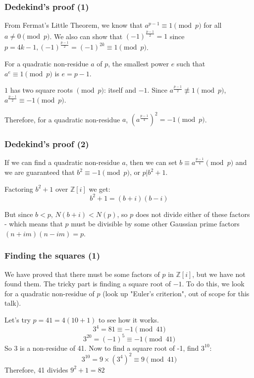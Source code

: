 \documentclass{beamer}
\begin{document}
\begin{frame}
	\frametitle{Dedekind's proof (1)}

	From Fermat's Little Theorem, we know that $a^{p-1} \equiv 1 \pmod{p}$ for all
	$a\neq 0 \pmod{p}$. We also can show that $(-1)^{\frac{p-1}{2}} = 1$ since 
	$p = 4k-1, (-1)^{\frac{p-1}{2}} = (-1)^{2k} \equiv 1 \pmod{p}$.

	For a quadratic non-residue $a$ of $p$, the smallest power $e$ such that $a^{e} \equiv 1 \pmod{p}$
	is $e = p-1$.

	$1$ has two square roots $\pmod{p}$: itself and $-1$. Since $a^{\frac{p-1}{2}} \not \equiv 1
	\pmod{p}$, $a^{\frac{p-1}{2}} \equiv -1 \pmod{p}$.

	Therefore, for a quadratic non-residue $a$, $(a^{\frac{p-1}{4}})^2 = -1 \pmod{p}$.

\end{frame}
\begin{frame}
	\frametitle{Dedekind's proof (2)}

	If we can find a quadratic non-residue $a$, then we can set $b \equiv a^{\frac{p-1}{4}} \pmod{p}$
	and we are guaranteed that $b^2 \equiv -1 \pmod{p}$, or $p | b^2+1$.

	Factoring $b^2+1$ over $\mathbb{Z}[i]$ we get:
	\[b^2 + 1 = (b+i)(b-i) \]
	
	But since $b<p$, $N(b+i)<N(p)$, so $p$ does not divide either of these factors - which means
	that $p$ must be divisible by some other Gaussian prime factors $(n+im)(n-im) = p$.
\end{frame}

\begin{frame}
	\frametitle{Finding the squares (1)}

	We have proved that there must be some factors of $p$ in $\mathbb{Z}[i]$, but we
	have not found them. The tricky part is finding a square root of $-1$. To do this,
	we look for a quadratic non-residue of $p$ (look up "Euler's criterion", out of
	scope for this talk).

	Let's try $p=41 = 4(10+1)$ to see how it works.
	\[ 3^4 = 81 \equiv -1 \pmod{41} \]
	\[ 3^{20} = (-1)^5 \equiv -1 \pmod{41} \]
	So 3 is a non-residue of 41. Now to find a square root of -1, find $3^{10}$:
	\[ 3^{10} = 9\times(3^4)^2 \equiv 9 \pmod{41} \]
	Therefore, 41 divides $9^2 + 1 = 82$
\end{frame}
\end{document}
